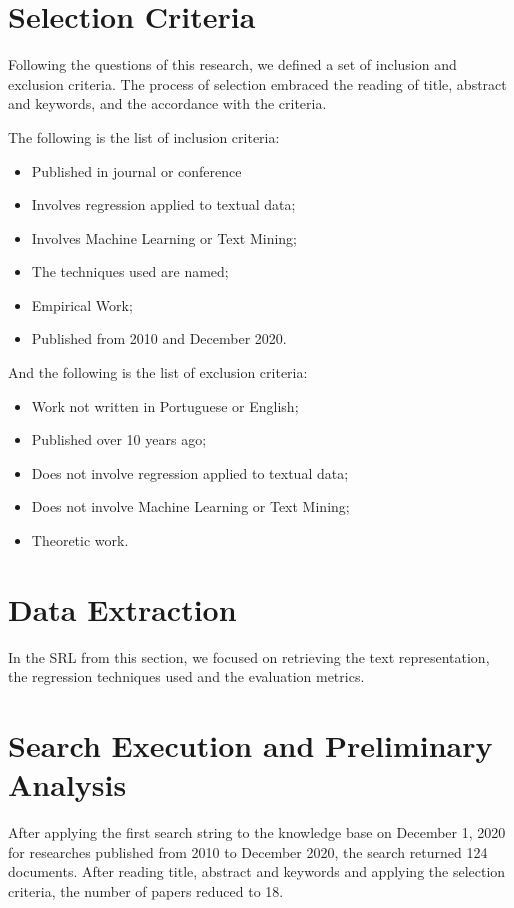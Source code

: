 \section{Selection Criteria}

Following the questions of this research, we defined a set of inclusion and exclusion criteria. The process of selection embraced the reading of title, abstract and keywords, and the accordance with the criteria.

The following is the list of inclusion criteria:

\begin{itemize}[noitemsep]
    \item Published in journal or conference
    \item Involves regression applied to textual data;
    \item Involves Machine Learning or Text Mining;
    \item The techniques used are named;
    \item Empirical Work;
    \item Published from 2010 and December 2020.
\end{itemize}

And the following is the list of exclusion criteria:

\begin{itemize}[noitemsep]
    \item Work not written in Portuguese or English;
    \item Published over 10 years ago;
    \item Does not involve regression applied to textual data;
    \item Does not involve Machine Learning or Text Mining;
    \item Theoretic work.
\end{itemize}

\section{Data Extraction}
In the SRL from this section, we focused on retrieving the text representation, the regression techniques used and the evaluation metrics.

\section{Search Execution and Preliminary Analysis}

After applying the first search string to the knowledge base on December 1, 2020 for researches published from 2010 to December 2020, the search returned 124 documents. After reading title, abstract and keywords and applying the selection criteria, the number of papers reduced to 18.



